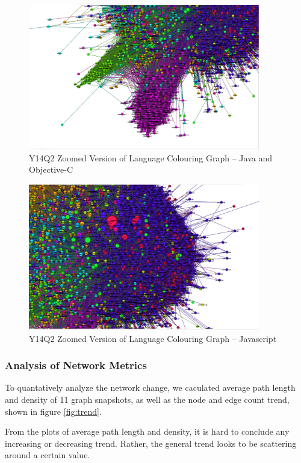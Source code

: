 \documentclass[11pt]{article}
\begin{document}
\begin{figure}[htp!]
  \centering
  \includegraphics[width=0.9\textwidth]{Y14Q2_lang_zoom_java.png} %
  \caption{Y14Q2 Zoomed Version of Language Colouring Graph -- Java and Objective-C}
  \label{fig:zoom_java_2014}
\end{figure}

\begin{figure}[htp!]
  \centering
  \includegraphics[width=0.9\textwidth]{Y14Q2_lang_zoom_js.png} %
  \caption{Y14Q2 Zoomed Version of Language Colouring Graph -- Javascript}
  \label{fig:zoom_js_2014}
\end{figure}

\subsubsection{Analysis of Network Metrics}
To quantatively analyze the network change, we caculated average path length and density of 11 graph snapshots, as well as the node and edge count trend, shown in figure \ref{fig:trend}.

From the plots of average path length and density, it is hard to conclude any increasing or decreasing trend. Rather, the general trend looks to be scattering around a certain value.
\end{document}
